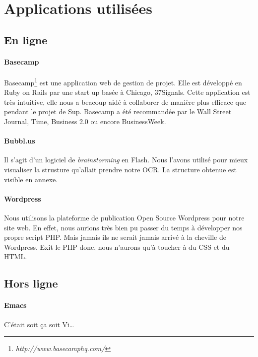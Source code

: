 \documentclass[]{report}
\begin{document}
	\section{Applications utilis\'ees} %
	\label{sec:applications_utilis'ees}
		\subsection{En ligne} %
		\label{sub:en_ligne}
			\paragraph{Basecamp\\} %
			\label{par:basecamp}
			Basecamp\footnote{\emph{http://www.basecamphq.com/}} est une application web de gestion de projet. Elle est développ\'e en Ruby on Rails par une start up bas\'ee \`a Chicago, 37Signals. Cette application est tr\`es intuitive, elle nous a beacoup aid\'e \`a collaborer de mani\`ere plus efficace que pendant le projet de Sup. Basecamp a \'et\'e recommand\'ee par le Wall Street Journal, Time, Business 2.0 ou encore BusinessWeek.
			\paragraph{Bubbl.us\\} %
			\label{par:bubbl_us}
			Il s'agit d'un logiciel de \emph{brainstorming} en Flash. Nous l'avons utilis\'e pour mieux visualiser la strusture qu'allait prendre notre OCR. La structure obtenue est visible en annexe. %
			\paragraph{Wordpress\\} %
			\label{par:wordpress}
			Nous utilisons la plateforme de publication Open Source Wordpress pour notre site web. En effet, nous aurions tr\`es bien pu passer du temps \`a d\'evelopper nos propre script PHP. Mais jamais ils ne serait jamais arriv\'e \`a la cheville de Wordpress. Exit le PHP donc, nous n'aurons qu'\`a toucher \`a du CSS et du HTML.
		\subsection{Hors ligne} %
		\label{sub:hors_ligne}
			\paragraph{Emacs\\} %
			\label{par:emacs}
				C'\'etait soit \c ca soit Vi\ldots
\end{document}
